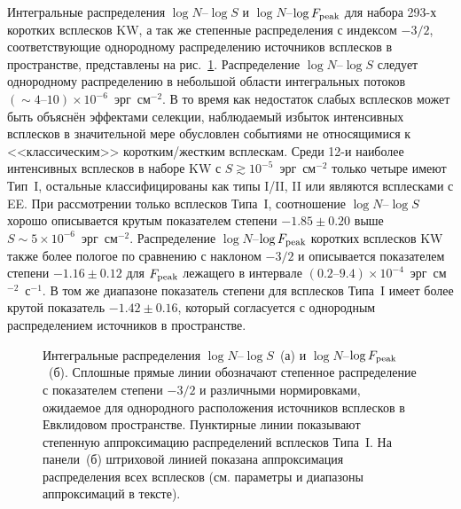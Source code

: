 Интегральные распределения $\log N$--$\log S$ и $\log N$--$\log F_{\mathrm{peak}}$
для набора 293-х коротких всплесков KW, а так же степенные распределения с индексом $-3/2$, 
соответствующие однородному распределению источников всплесков в пространстве,
представлены на рис.~\ref{fig:logNlogS_PF}.
Распределение $\log N$--$\log S$ следует однородному распределению в небольшой 
области интегральных потоков $(\sim 4\textrm{--}10)\times 10^{-6}$~эрг~см$^{-2}$.
В то время как недостаток слабых всплесков может быть объяснён эффектами селекции,
наблюдаемый избыток интенсивных всплесков в значительной мере обусловлен событиями 
не относящимися к <<классическим>> коротким/жестким всплескам. Среди 12-и наиболее 
интенсивных всплесков в наборе KW с $S \gtrsim 10^{-5}$~эрг~см$^{-2}$ только 
четыре имеют Тип~I, остальные классифицированы как типы I/II, II или являются всплесками с EE.
При рассмотрении только всплесков Типа~I, соотношение $\log N$--$\log S$ хорошо 
описывается крутым показателем степени $-1.85 \pm 0.20$ выше $S\sim 5\times 10^{-6}$~эрг~см$^{-2}$.
Распределение $\log N$--$\log F_{\mathrm{peak}}$ коротких всплесков KW также более пологое 
по сравнению с наклоном $-3/2$ и описывается показателем степени 
$-1.16 \pm 0.12$ для $F_{\mathrm{peak}}$ лежащего в интервале
$(0.2\textrm{--}9.4)\times 10^{-4}$~эрг~см$^{-2}$~с$^{-1}$.
В том же диапазоне показатель степени для всплесков Типа~I имеет более крутой показатель 
$-1.42 \pm 0.16$, который согласуется с однородным распределением источников в пространстве.

\begin{figure}
    \begin{minipage}[h]{0.5\textwidth}
    \end{minipage}
    \hfill
    \begin{minipage}[h]{0.5\textwidth}
	\end{minipage}
\caption{
    Интегральные распределения $\log N$--$\log S$~(а) и $\log N$--$\log F_{\mathrm{peak}}$~(б).
    Сплошные прямые линии обозначают степенное распределение с показателем степени $-3/2$ 
    и различными нормировками, ожидаемое для однородного расположения источников всплесков в Евклидовом пространстве.
    Пунктирные линии показывают степенную аппроксимацию распределений всплесков Типа~I.
    На панели~(б) штриховой линией показана аппроксимация распределения всех всплесков 
    (см. параметры и диапазоны аппроксимаций в тексте).
    \label{fig:logNlogS_PF} }
\end{figure}

